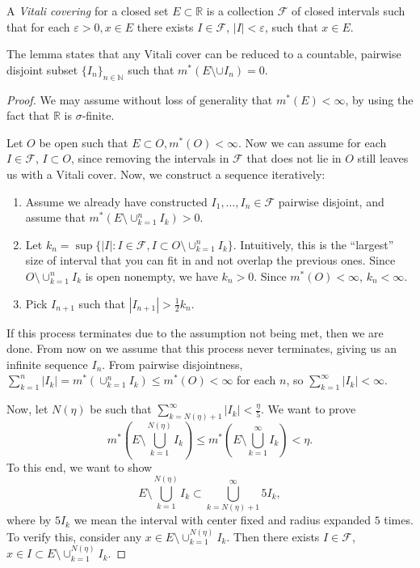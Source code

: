 
\newpage
\begin{theorem}
	\label{thm:VitaliCoveringLem}
	
	A \textit{Vitali covering} for a closed set $E \subset \mathbb{R}$ is a collection $\mathcal{F}$ of closed intervals such that for each $\varepsilon>0, x \in E$ there exists $I \in \mathcal{F}$, $|I| < \varepsilon$, such that $x \in E$.

	The lemma states that any Vitali cover can be reduced to a countable, pairwise disjoint subset $\{I_n\} _{n \in \mathbb{N}}$ such that $m^*(E \setminus \cup I_n) = 0$.
\end{theorem}
\begin{proof}
	We may assume without loss of generality that $m^*(E) < \infty $, by using the fact that $\mathbb{R}$ is $\sigma$-finite. 

	Let $O$ be open such that $E \subset O, m^*(O) < \infty $. Now we can assume for each $I \in \mathcal{F}$, $I \subset O$, since removing the intervals in $\mathcal{F}$ that does not lie in $O$ still leaves us with a Vitali cover. Now, we construct a sequence iteratively:
	\begin{enumerate}
		\item Assume we already have constructed $I_{1}, \ldots, I_n \in \mathcal{F}$ pairwise disjoint, and assume that $m^*(E \setminus \cup _{k = 1}^n I_k) > 0$.
		\item Let $k_n = \sup \{|I|: I \in \mathcal{F}, I \subset O \setminus  \cup _{k = 1}^n I_k\} $. Intuitively, this is the ``largest'' size of interval that you can fit in and not overlap the previous ones. Since $O \setminus \cup_{k = 1}^n I_k$ is open nonempty, we have $k_n > 0$. Since $m^*(O) < \infty $, $k_n < \infty $.
		\item Pick $I_{n + 1}$ such that $|I_{n + 1}| > \frac{1}{2} k_n$.
	\end{enumerate}
	If this process terminates due to the assumption not being met, then we are done. From now on we assume that this process never terminates, giving us an infinite sequence $I_n$. From pairwise disjointness, $\sum_{k = 1}^n |I_k| = m^*(\cup _{k = 1}^n I_k) \le m^*(O) < \infty $ for each $n$, so $\sum_{k = 1}^\infty  |I_k| < \infty $. 

	Now, let $N(\eta)$ be such that $\sum_{k = N(\eta) + 1}^\infty |I_k| < \frac{\eta}{5}$. We want to prove
	\[
		m^*\left( E \setminus \bigcup_{k = 1} ^{N(\eta)} I_k \right) 
		\le 
		m^*\left( E \setminus \bigcup_{k = 1} ^{\infty } I_k \right) 
		< \eta
	.\] 
	To this end, we want to show
	\[
		E\setminus \bigcup_{k = 1} ^{N(\eta)} I_k
		\subset 
		\bigcup_{k = N(\eta) + 1} ^\infty 5 I_k
	,\] 
	where by $5 I_k$ we mean the interval with center fixed and radius expanded $5$ times. To verify this, consider any $x \in E \setminus \cup_{k = 1}^{N(\eta)} I_k$. Then there exists $I \in \mathcal{F}$, $x \in I \subset E \setminus \cup_{k = 1}^{N(\eta)} I_k$. 


\end{proof}
